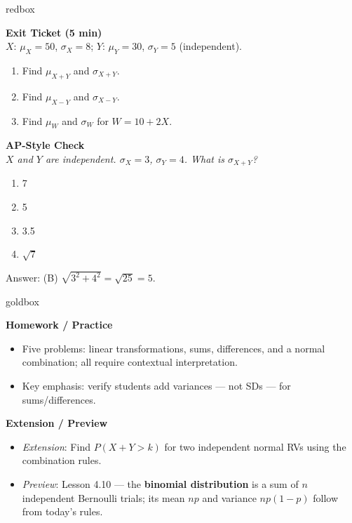 \documentclass[10pt]{article}
\begin{document}
\begin{skillbox}{redbox}
\begin{minipage}[t]{0.48\linewidth}
    \textbf{Exit Ticket (5 min)}\\
    $X$: $\mu_X = 50$, $\sigma_X = 8$; $Y$: $\mu_Y = 30$, $\sigma_Y = 5$ (independent).
    \begin{enumerate}
        \item Find $\mu_{X+Y}$ and $\sigma_{X+Y}$.
        \item Find $\mu_{X-Y}$ and $\sigma_{X-Y}$.
        \item Find $\mu_W$ and $\sigma_W$ for $W = 10 + 2X$.
    \end{enumerate}
\end{minipage}
\hfill
\begin{minipage}[t]{0.48\linewidth}
    \textbf{AP-Style Check}\\
    \textit{$X$ and $Y$ are independent. $\sigma_X = 3$, $\sigma_Y = 4$.
    What is $\sigma_{X+Y}$?}
    \begin{enumerate}[label=(\Alph*)]
        \item 7
        \item 5
        \item 3.5
        \item $\sqrt{7}$
    \end{enumerate}
    Answer: (B) $\sqrt{3^2 + 4^2} = \sqrt{25} = 5$.
\end{minipage}
\end{skillbox}

\begin{skillbox}{goldbox}
\begin{minipage}[t]{0.48\linewidth}
    \textbf{Homework / Practice}
    \begin{itemize}
        \item Five problems: linear transformations, sums, differences, and a
              normal combination; all require contextual interpretation.
        \item Key emphasis: verify students add variances --- not SDs --- for
              sums/differences.
    \end{itemize}
\end{minipage}
\hfill
\begin{minipage}[t]{0.48\linewidth}
    \textbf{Extension / Preview}
    \begin{itemize}
        \item \textit{Extension}: Find $P(X + Y > k)$ for two independent normal
              RVs using the combination rules.
        \item \textit{Preview}: Lesson 4.10 --- the \textbf{binomial distribution} is
              a sum of $n$ independent Bernoulli trials; its mean $np$ and variance
              $np(1-p)$ follow from today's rules.
    \end{itemize}
\end{minipage}
\end{skillbox}
\end{document}
